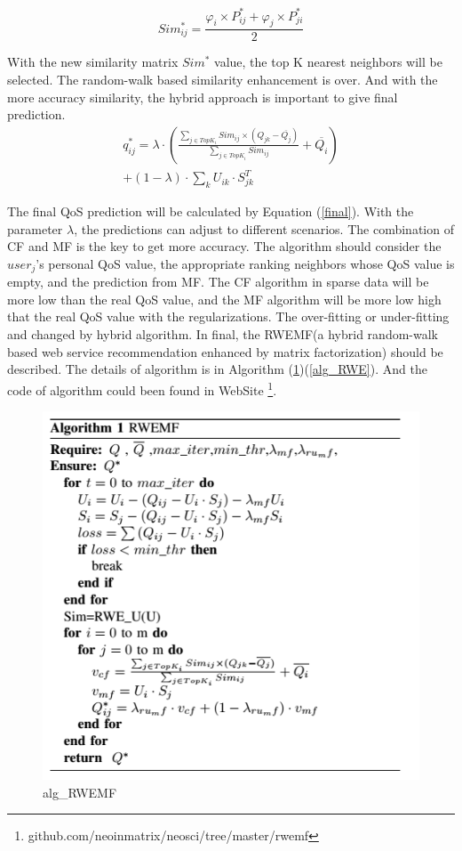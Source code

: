 \documentclass[conference]{IEEEtran}
\begin{document}
\begin{equation}\label{eqsime} 
Sim_{ij}^{*}=\frac
{
\varphi_{i} \times P^{*}_{ij} + \varphi_{j} \times P^{*}_{ji}
}{2}
\end{equation}
\par With the new similarity matrix $Sim^{*}$ value, the top K nearest neighbors will be selected. The random-walk based similarity enhancement is over. And with the more accuracy similarity, the hybrid approach is important to give final prediction.
\begin{equation}
\begin{aligned}
q_{ij}^{*}= \lambda \cdot (
\frac{
  \sum_{j \in TopK_{i}}{Sim_{ij} \times (Q_{jk}-\overline{Q_{j}})}
}{\sum_{j \in TopK_{i}}{Sim_{ij}}
}+\overline{Q_{i}}
) \\ + (1-\lambda) \cdot \sum_{k}U_{ik} \cdot S_{jk}^{T}
\label{final}
\end{aligned}
\end{equation}
\par The final QoS prediction will be calculated by Equation (\ref{final}). With the parameter $\lambda$, the predictions can adjust to different scenarios. The combination of CF and MF is the key to get more accuracy. The algorithm should consider the $user_{j}$'s personal QoS value, the appropriate ranking neighbors whose QoS value is empty, and the prediction from MF. The CF algorithm in sparse data will be more low than the real QoS value, and the MF algorithm will be more low high that the real QoS value with the regularizations. The over-fitting or under-fitting and changed by hybrid algorithm. In final, the RWEMF(a hybrid random-walk based web service recommendation enhanced by matrix factorization) should be described. The details of algorithm is in Algorithm (\ref{alg_RWEMF})(\ref{alg_RWE}). And the code of algorithm could been found in WebSite \footnote{github.com/neoinmatrix/neosci/tree/master/rwemf}.
\begin{figure}[H] 
\centering  
\includegraphics[width=0.45\paperwidth]{alg1.png}  
\caption{alg_RWEMF}  
\label{alg_RWEMF}  
\end{figure} 
\end{document}
